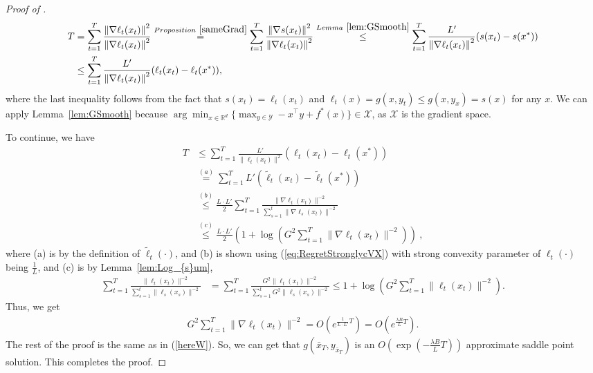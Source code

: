 \documentclass[pmlr]{jmlr} %
\def\reals{\mathbb{R}}
\def\reals{\mathbb{R}}
\newcommand{\norm}[1]{\left\lVert#1\right\rVert}
\newcommand{\norme}[1]{\norm{#1}}
\newcommand{\yx}[1]{y_{#1}}
\newcommand{\XX}{\mathcal{X}}
\newcommand{\YY}{\mathcal{Y}}
\begin{document}
\begin{proof}[Proof of ]
\begin{comment}
We are now ready to prove the theorem.
\end{comment}

\begin{align}
T &= \sum_{t=1}^{T} \frac{\norme{ \nabla \ell_{t}(x_{t})}^{2}}{\norme{ \nabla \ell_{t}(x_{t})}^{2}}
\overset{Proposition~\ref{sameGrad}}{ = }\sum_{t=1}^{T} \frac{\norme{\nabla s(x_{t})}^{2}}{\norme{ \nabla \ell_{t}(x_{t})}^{2}}
\overset{Lemma~\ref{lem:GSmooth}}{ \le} \sum_{t=1}^{T} \frac{L'}{\norme{ \nabla \ell_{t}(x_{t})}^{2}} (s(x_{t}) - s(x^{*}))\\
&\le \sum_{t=1}^{T} \frac{L'}{\norme{ \nabla \ell_{t}(x_{t})}^{2}} (\ell_{t}(x_{t}) - \ell_{t}(x^{*}))\label{eq:normal},
\end{align}
where the last inequality follows from the fact that $s(x_{t}) = \ell_{t}(x_{t})$ and $\ell_{t}(x) = g(x,y_{t}) \le g(x,\yx{x}) = s(x)$ for any $x$. We can apply Lemma~\ref{lem:GSmooth} because 
$\arg\min_{x \in \reals^d} \{ \max_{y \in \YY} - x^{\top} y + f^{*}(x) \} \in \XX$, as $\XX$ is the gradient space. 


To continue, we have
\begin{equation} \label{eq:ExpRate}
\begin{aligned}
T & \leq
\sum_{t=1}^{T} \frac{{ L' }}{\| \ell_{t}( x_{t}) \|^{2}} ( \ell_{t}(x_{t})-\ell_{t}(x^{*}) )  \nonumber \\
&\overset{(a)}{=}
\sum_{t=1}^{T} L' ( \tilde{\ell}_{t}(x_{t})-\tilde{\ell}_{t}(x^{*}) )  \nonumber \\
&\overset{(b)}{\le}
\frac{L\cdot L'}{2} \sum_{t=1}^{T} \frac{\| \nabla \ell_{t}( x_{t}) \|^{-2}}{\sum_{s=1}^{t} \|\nabla \ell_{s}(x_{t}) \|^{-2}}\nonumber \\
&\overset{(c)}{\le}
\frac{L\cdot L'}{2}\left( 1+\log(G^{2} \sum_{t=1}^{T}\|\nabla \ell_{t}( x_{t})\|^{-2}) \right)~,
\end{aligned}
\end{equation}
where (a) is by the definition of $\tilde{\ell}_{t}(\cdot)$,
and (b) is shown using (\ref{eq:RegretStronglycVX}) with strong convexity parameter of $\ell_{t}(\cdot)$ being $\frac{1}{L}$, and (c) is by Lemma~\ref{lem:Log_{s}um},
\begin{align*}
\sum_{t=1}^{T} \frac{\| \ell_{t}( x_{t}) \|^{-2}}{\sum_{s=1}^{t} \| \ell_{s}( x_{s}) \|^{-2}}
&=
\sum_{t=1}^{T} \frac{G^{2}\| \ell_{t}( x_{t}) \|^{-2}}{\sum_{s=1}^{t} G^{2}\| \ell_{s}( x_{s}) \|^{-2}}
\leq{}
{1+\log(G^{2} \sum_{t=1}^{T}\| \ell_{t}( x_{t})\|^{-2})}.
\end{align*}
Thus, we get
\begin{align} 
G^{2} \sum_{t=1}^{T} \| \nabla \ell_{t}(x_{t}) \|^{-2} = O(  e^{\frac{1}{L\cdot L'}T}) =  O(  e^{\frac{\lambda B}{L}T}).
\end{align}
The rest of the proof is the same as in (\ref{hereW}). 
So, we can get that $g(\bar{x}_{T}, \yx{\bar{x}_{T}})$ is an $O(\exp(-\frac{\lambda B}{L}T))$ approximate saddle point solution. This completes the proof.

\end{proof}
\end{document}
